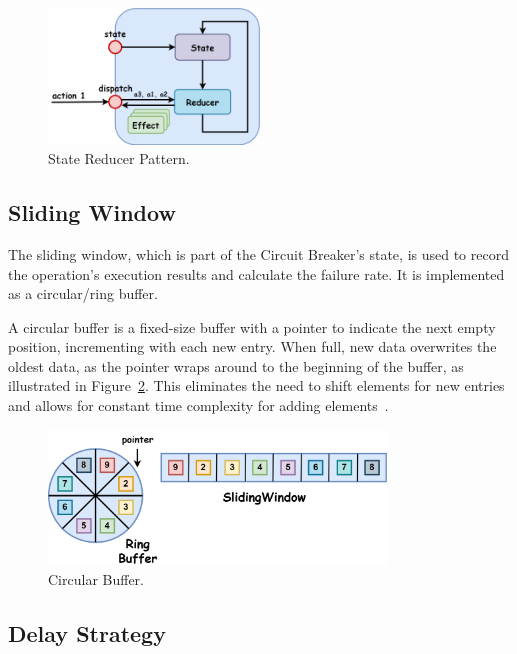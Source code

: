 \begin{figure}[!htb]
    \centering
    \includegraphics[width=0.5\textwidth]{../figures/05_reducer-pattern}
    \caption{State Reducer Pattern.}
    \label{fig:reducer-pattern}
\end{figure}

\subsection{Sliding Window}\label{subsec:cbreaker-sliding-window}

The sliding window, which is part of the Circuit Breaker's state, is used to record the operation's execution results and calculate the failure rate.
It is implemented as a circular/ring buffer.

A circular buffer is a fixed-size buffer with a pointer to indicate the next empty position, incrementing with each new entry.
When full, new data overwrites the oldest data, as the pointer wraps around to the beginning of the buffer, as illustrated in Figure~\ref{fig:05_circular-buffer}.
This eliminates the need to shift elements for new entries and allows for constant time complexity for adding elements~\cite{circular-buffer}.

\begin{figure}[!htb]
    \centering
    \includegraphics[width=0.8\textwidth]{../figures/05_circular-buffer}
    \caption{Circular Buffer.}
    \label{fig:05_circular-buffer}
\end{figure}

\subsection{Delay Strategy}\label{subsec:cbreaker-delay-strategy}

